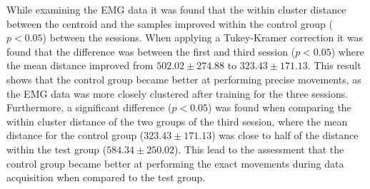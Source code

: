 While examining the EMG data it was found that the within cluster distance between the centroid and the samples improved within the control group ($p < 0.05$) between the sessions. When applying a Tukey-Kramer correction it was found that the difference was between the first and third session ($p < 0.05$) where the mean distance improved from $502.02 \pm 274.88$ to $323.43 \pm 171.13$. This result shows that the control group became better at performing precise movements, as the EMG data was more closely clustered after training for the three sessions. \\
Furthermore, a significant difference ($p < 0.05$) was found when comparing the within cluster distance of the two groups of the third session, where the mean distance for the control group ($323.43 \pm 171.13$) was close to half of the distance within the test group ($584.34 \pm 250.02$). This lead to the assessment that the control group became better at performing the exact movements during data acquisition when compared to the test group.%

